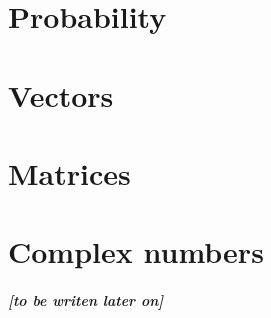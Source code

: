 \documentclass[11pt]{report}
\begin{document}
	\maketitle
	\tableofcontents
	
	\chapter{Probability}
	\chapter{Vectors}
	\chapter{Matrices}
	\chapter{Complex numbers}

    \paragraph{
    [to be writen later on]
    }
\end{document}
